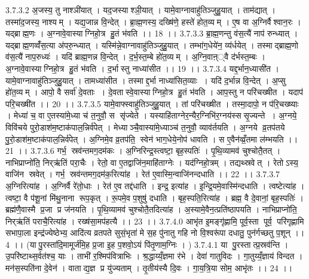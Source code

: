 3.7.3.2
अ॒जस्य॒ तु नाश्ञी॑यात् । यद॒जस्याश्ञी॒यात् । यामे॒वाग्नावाहु॑तिञ्जुहु॒यात् । ताम॑द्यात् । तस्मा॑द॒जस्य॒ नाश्यम् । यद्य॒जान्न वि॒न्देत् । ब्रा॒ह्म॒णस्य॒ दख्षि॑णे॒ हस्ते॑ होत॒व्यम् । ए॒ष वा अ॒ग्निर्वैश्वान॒रः । यद्ब्राह्म॒णः । अ॒ग्नावे॒वास्याग्निहो॒त्र हु॒तं भ॑वति ।। 18 ।।
3.7.3.3
ब्रा॒ह्म॒णन्तु व॑स॒त्यै॑ नाप॑ रुन्ध्यात् । यद्ब्राह्म॒णव्वँ॑स॒त्या अ॑परु॒न्ध्यात् । यस्मि॑न्ने॒वाग्नावाहु॑तिञ्जुहु॒यात् । तम्भा॑ग॒धेये॑न॒ व्य॑र्धयेत् । तस्माद्ब्राह्म॒णो व॑स॒त्यै॑ नाप॒रुध्यः॑ । यदि॑ ब्राह्म॒णन्न वि॒न्देत् । द॒र्भ॒स्त॒म्बे हो॑त॒व्यम् । अ॒ग्नि॒वाऩ््वै द॑र्भस्त॒म्बः । अ॒ग्नावे॒वास्याग्निहो॒त्र हु॒तं भ॑वति । द॒र्भास्तु नाध्या॑सीत ।। 19 ।।
3.7.3.4
यद्द॒र्भान॒ध्यासी॑त । यामे॒वाग्नावाहु॑तिञ्जुहु॒यात् । तामध्या॑सीत । तस्माद्द॒र्भा नाध्या॑सित॒व्याः । यदि॑ द॒र्भान्न वि॒न्देत् । अ॒प्सु हो॑त॒व्यम् । आपो॒ वै सर्वा॑ दे॒वताः । दे॒वतास्वे॒वास्याग्निहो॒त्र हु॒तं भ॑वति । आप॒स्तु न परि॑चख्षीत । यदाप॑ परि॒चख्षी॑त ।। 20 ।।
3.7.3.5
यामे॒वाफ्स्वाहु॑तिञ्जुहु॒यात् । तां परि॑चख्षीत । तस्मा॒दापो॒ न प॑रि॒चख्ष्याः । मेध्या॑ च॒ वा ए॒तस्या॑मे॒ध्या च॑ त॒नुवौ॒ स सृ॑ज्येते । यस्याहि॑ताग्नेर॒न्यैर॒ग्निभि॑र॒ग्नय॑स्ससृ॒ज्यन्ते । अ॒ग्नये॒ विवि॑चये पुरो॒डाश॑म॒ष्टाक॑पाल॒न्निर्व॑पेत् । मेध्याञ्चै॒वास्या॑मे॒ध्याञ्च॑ त॒नुवौ॒ व्याव॑र्तयति । अ॒ग्नये व्र॒तप॑तये पु॒रो॒डाश॑म॒ष्टाक॑पाल॒न्निर्व॑पेत् । अ॒ग्निमे॒व व्र॒तप॑ति॒॒ स्वेन॑ भाग॒धेये॒नोप॑ धावति । स ए॒वैन॑व्व्रँ॒तमा ल॑म्भयति ।। 21 ।।
3.7.3.6
गर्भ॒॒ स्रव॑न्तमग॒दम॑कः । अ॒ग्निरिन्द्र॒स्त्वष्टा॒ बृह॒स्पतिः॑ । पृ॒थि॒व्यामव॑ चुश्चोतै॒तत् । नाभिप्राप्नो॑ति॒ निर्‌ऋ॑तिं परा॒चैः । रेतो॒ वा ए॒तद्वाजि॑न॒माहि॑ताग्नेः । यद॑ग्निहो॒त्रम् । तद्यथ्स्रवेत् । रेतोऽस्य॒ वाजि॑न स्रवेत् । गर्भ॒॒ स्रव॑न्तमग॒दम॑क॒रित्या॑ह । रेत॑ ए॒वास्मि॒न्वाजि॑नन्दधाति ।। 22 ।।
3.7.3.7
अ॒ग्निरित्या॑ह । अ॒ग्निर्वै रे॑तो॒धाः । रेत॑ ए॒व तद्द॑धाति । इन्द्र॒ इत्या॑ह । इ॒न्द्रि॒यमे॒वास्मि॑न्दधाति । त्वष्टेत्या॑ह । त्वष्टा॒ वै प॑शू॒नां मि॑थु॒नाना॑ रूप॒कृत् । रू॒पमे॒व प॒शुषु॑ दधाति । बृह॒स्पति॒रित्या॑ह । ब्रह्म॒ वै दे॒वानां॒ बृह॒स्पतिः॑ । ब्रह्म॑णै॒वास्मै प्र॒जा प्र ज॑नयति । पृ॒थि॒व्यामव॑ चुश्चोतै॒तदित्या॑ह । अ॒स्यामे॒वैन॒त्प्रति॑ष्ठापयति । नाभिप्राप्नो॑ति॒ निर्‌ऋ॑तिं पराचै॒रित्या॑ह । रख्ष॑सा॒मप॑हत्यै ।। 23 ।।
3.7.4.0
आभृ॑त इ॒मङ्गृ॑ह्णामि॒ पूर्व॒स्ता पूर्व॒ परि॑गृह्णामि सभापा॒ला इन्द्र॑ज्येष्ठेभ्य॒ आदि॑त्य व्रतपते सुसं॒भृता॑ मे स॒ह पु॑नातु गहि नो वि॒श्वरू॑पा दधातु॒ पुन॑र्गच्छतु प॒शून् ।। 4 ।। (यापु॒रस्ता॑दि॒मामूर्ज॑मि॒ह प्र॒जा इ॒ह प॒शवो॒ऽयं पि॑तृ॒णाम॒ग्निः । )
3.7.4.1
या पु॒रस्तात्प्र॒स्रव॑न्ति । उ॒परि॑ष्टाथ्स॒र्वत॑श्च॒ याः । ताभी॑ र॒श्मिप॑वित्राभिः । श्र॒द्धाय्यँ॒ज्ञमा र॑भे । देवा॑ गातुविदः । गा॒तुय्यँ॒ज्ञाय॑ विन्दत । मन॑स॒स्पति॑ना दे॒वेन॑ । वाताद्य॒ज्ञ प्र यु॑ज्यताम् । तृ॒तीय॑स्यै दि॒वः । गा॒य॒त्रि॒या सोम॒ आभृ॑तः ।। 24 ।।
